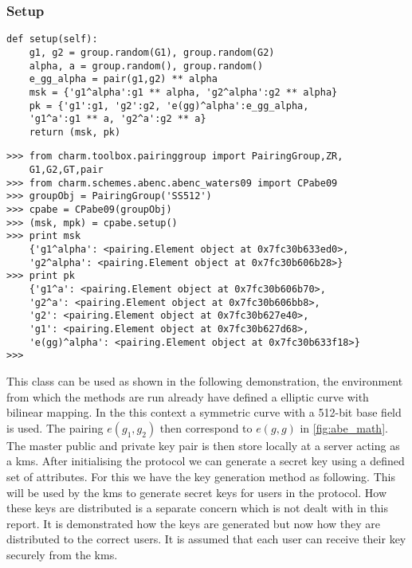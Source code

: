 \subsubsection{Setup}


\begin{verbatim}
def setup(self):
    g1, g2 = group.random(G1), group.random(G2)
    alpha, a = group.random(), group.random()        
    e_gg_alpha = pair(g1,g2) ** alpha
    msk = {'g1^alpha':g1 ** alpha, 'g2^alpha':g2 ** alpha} 
    pk = {'g1':g1, 'g2':g2, 'e(gg)^alpha':e_gg_alpha, 
    'g1^a':g1 ** a, 'g2^a':g2 ** a}
    return (msk, pk)
\end{verbatim}

\begin{lstlisting}
>>> from charm.toolbox.pairinggroup import PairingGroup,ZR,
    G1,G2,GT,pair
>>> from charm.schemes.abenc.abenc_waters09 import CPabe09
>>> groupObj = PairingGroup('SS512')
>>> cpabe = CPabe09(groupObj)
>>> (msk, mpk) = cpabe.setup()
>>> print msk
    {'g1^alpha': <pairing.Element object at 0x7fc30b633ed0>, 
    'g2^alpha': <pairing.Element object at 0x7fc30b606b28>}
>>> print pk
    {'g1^a': <pairing.Element object at 0x7fc30b606b70>, 
    'g2^a': <pairing.Element object at 0x7fc30b606bb8>, 
    'g2': <pairing.Element object at 0x7fc30b627e40>, 
    'g1': <pairing.Element object at 0x7fc30b627d68>, 
    'e(gg)^alpha': <pairing.Element object at 0x7fc30b633f18>}
>>>
\end{lstlisting}

This class can be used as shown in the following demonstration, the environment from which the methods are run already have defined a elliptic curve with bilinear mapping. In the this context a symmetric curve with a 512-bit base field is used. The pairing $e(g_1,g_2)$ then correspond to $e(g,g)$ in \ref{fig:abe_math}.  The master public and private key pair is then store locally at a server acting as a \gls{kms}. After initialising the protocol we can generate a secret key using a defined set of attributes. For this we have the key generation method as following. This will be used by the \gls{kms} to generate secret keys for users in the protocol. How these keys are distributed is a separate concern which is not dealt with in this report. It is demonstrated how the keys are generated but now how they are distributed to the correct users. It is assumed that each user can receive their key securely from the \gls{kms}.


